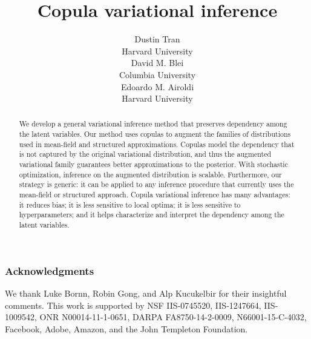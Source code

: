 \documentclass[usenames,dvipsnames]{article}
\title{Copula variational inference}
\author{
Dustin Tran\\
Harvard University\\
\And
David M. Blei \\
Columbia University \\
\And
Edoardo M. Airoldi  \\
Harvard University \\
}
\begin{document}
\maketitle

\begin{abstract}
  We develop a general variational inference method that preserves
  dependency among the latent variables. Our method uses copulas to
  augment the families of distributions used in mean-field and
  structured approximations. Copulas model the dependency that is not
  captured by the original variational distribution, and thus the
  augmented variational family guarantees better approximations to the
  posterior. With stochastic optimization, inference on the augmented
  distribution is scalable. Furthermore, our strategy is generic: it
  can be applied to any inference procedure that currently uses the
  mean-field or structured approach.
  Copula variational inference has many advantages: it reduces bias;
  it is less sensitive to local optima; it is less sensitive to
  hyperparameters; and it helps characterize and interpret the
  dependency among the latent variables.
\end{abstract}







\subsubsection*{Acknowledgments}
We thank Luke Bornn, Robin Gong, and Alp Kucukelbir for their
insightful comments.
This work is supported by NSF IIS-0745520, IIS-1247664, IIS-1009542,
ONR N00014-11-1-0651, DARPA FA8750-14-2-0009, N66001-15-C-4032,
Facebook, Adobe, Amazon, and the John Templeton Foundation.


\small

\end{document}
